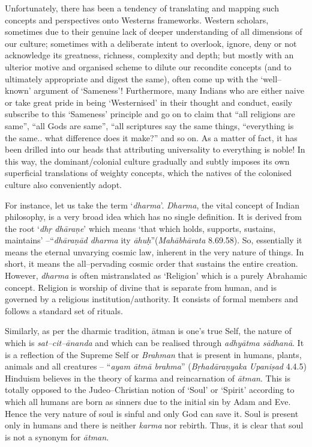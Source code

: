 Unfortunately, there has been a tendency of translating and mapping such concepts and perspectives onto Westerns frameworks. Western scholars, sometimes due to their genuine lack of deeper understanding of all dimensions of our culture; sometimes with a deliberate intent to overlook, ignore, deny or not acknowledge its greatness, richness, complexity and depth; but mostly with an ulterior motive and organised scheme to dilute our recondite concepts (and to ultimately appropriate and digest the same), often come up with the ‘well–known’ argument of ‘Sameness’! Furthermore, many Indians who are either naive or take great pride in being ‘Westernised’ in their thought and conduct, easily subscribe to this ‘Sameness’ principle and go on to claim that “all religions are same”, “all Gods are same”, “all scriptures say the same things, “everything is the same.. what difference does it make?” and so on. As a matter of fact, it has been drilled into our heads that attributing universality to everything is noble! In this way, the dominant/colonial culture gradually and subtly imposes its own superficial translations of weighty concepts, which the natives of the colonised culture also conveniently adopt.

For instance, let us take the term ‘\textit{dharma}’. \textit{Dharma}, the vital concept of Indian philosophy, is a very broad idea which has no single definition. It is derived from the root ‘\textit{dhṛ dhāraṇe}’ which means ‘that which holds, supports, sustains, maintains’ –“\textit{dhāraṇād dharma} ity \textit{āhuḥ}”(\textit{Mahābhārata} 8.69.58). So, essentially it means the eternal unvarying cosmic law, inherent in the very nature of things. In short, it means the all–pervading cosmic order that sustains the entire creation. However, \textit{dharma} is often mistranslated as ‘Religion’ which is a purely Abrahamic concept. Religion is worship of divine that is separate from human, and is governed by a religious institution/authority. It consists of formal members and follows a standard set of rituals. 

Similarly, as per the dharmic tradition, ātman is one’s true Self, the nature of which is \textit{sat–cit–ānanda} and which can be realised through \textit{adhyātma sādhanā}. It is a reflection of the Supreme Self or \textit{Brahman} that is present in humans, plants, animals and all creatures – “\textit{ayam ātmā brahma}” (\textit{Bṛhadāraṇyaka Upaniṣad} 4.4.5) Hinduism believes in the theory of karma and reincarnation of \textit{ātman}. This is totally opposed to the Judeo–Christian notion of ‘Soul’ or ‘Spirit’ according to which all humans are born as sinners due to the initial sin by Adam and Eve. Hence the very nature of soul is sinful and only God can save it. Soul is present only in humans and there is neither \textit{karma} nor rebirth. Thus, it is clear that soul is not a synonym for \textit{ātman}.

